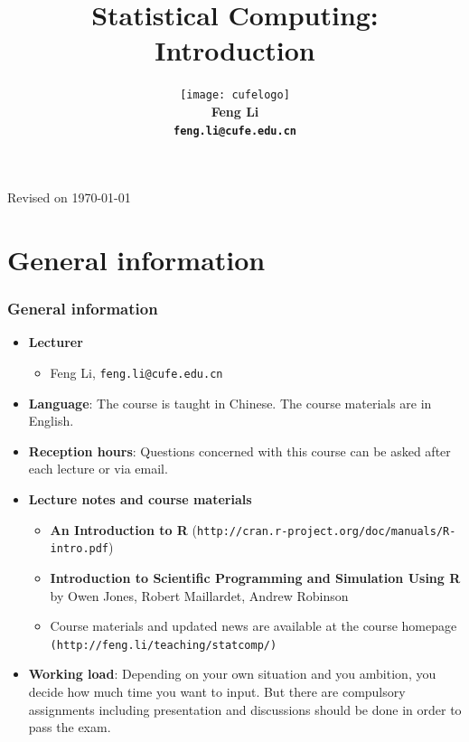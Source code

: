 \documentclass[10pt]{beamer}
\title[Statistical Computing]{{\textbf{Statistical Computing: Introduction}}}
\author[Feng Li]{\texttt{[image: cufelogo]}\\
  \vspace{0.5cm}\textbf{Feng Li\\\texttt{feng.li@cufe.edu.cn}}}
\date{}
\institute[Stat \& Math, CUFE]{\footnotesize{\textbf{School of Statistics and
      Mathematics\\ Central University of Finance and Economics}}}
\begin{document}
\begin{frame}[plain]
  \titlepage
  \tiny{Revised on \today}
\end{frame}


\section{General information}
\begin{frame}
  \frametitle{General information}
  \begin{itemize}

  \item \textbf{Lecturer}

    \begin{itemize}
    \item Feng Li, \texttt{feng.li@cufe.edu.cn}
    \end{itemize}
  \item \textbf{Language}: The course is taught in Chinese. The course
    materials are in English. %

  \item \textbf{Reception hours}: Questions concerned with this course can be
    asked after each lecture or via email.

  \item \textbf{Lecture notes and course materials}

    \begin{itemize}

    \item \textbf{An Introduction to R} (\texttt{http://cran.r-project.org/doc/manuals/R-intro.pdf})

    \item \textbf{Introduction to Scientific Programming and Simulation Using R} by Owen
      Jones, Robert Maillardet, Andrew Robinson


    \item Course materials and updated news are available at the course homepage
      \texttt{(http://feng.li/teaching/statcomp/)}

    \end{itemize}


  \item \textbf{Working load}: Depending on your own situation and you
    ambition, you decide how much time you want to input. But there are
    compulsory assignments including presentation and discussions should be
    done in order to pass the exam.

  \end{itemize}
\end{frame}
\end{document}
